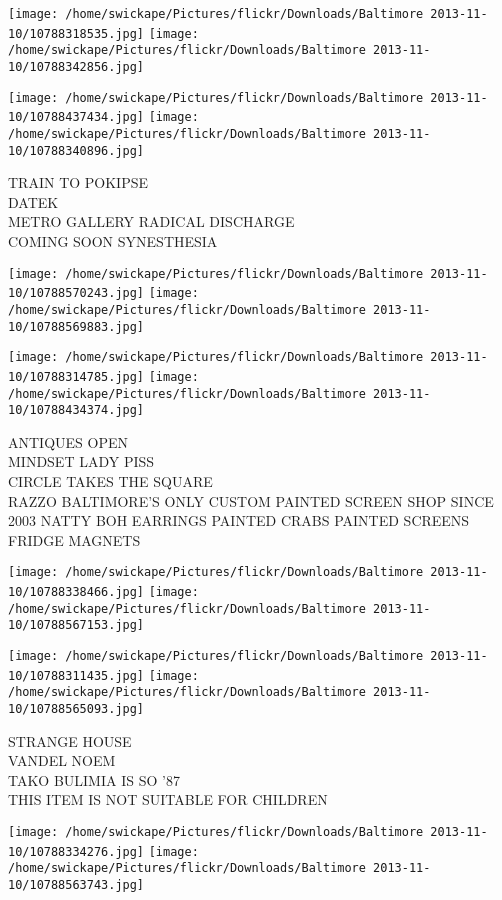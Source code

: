 \documentclass[10pt,letterpaper]{article}
\begin{document}
\texttt{[image: /home/swickape/Pictures/flickr/Downloads/Baltimore 2013-11-10/10788318535.jpg]}
\texttt{[image: /home/swickape/Pictures/flickr/Downloads/Baltimore 2013-11-10/10788342856.jpg]}

\texttt{[image: /home/swickape/Pictures/flickr/Downloads/Baltimore 2013-11-10/10788437434.jpg]}
\texttt{[image: /home/swickape/Pictures/flickr/Downloads/Baltimore 2013-11-10/10788340896.jpg]}

TRAIN TO POKIPSE\\
DATEK\\
METRO GALLERY RADICAL DISCHARGE\\
COMING SOON SYNESTHESIA
\pagebreak

\texttt{[image: /home/swickape/Pictures/flickr/Downloads/Baltimore 2013-11-10/10788570243.jpg]}
\texttt{[image: /home/swickape/Pictures/flickr/Downloads/Baltimore 2013-11-10/10788569883.jpg]}

\texttt{[image: /home/swickape/Pictures/flickr/Downloads/Baltimore 2013-11-10/10788314785.jpg]}
\texttt{[image: /home/swickape/Pictures/flickr/Downloads/Baltimore 2013-11-10/10788434374.jpg]}

ANTIQUES OPEN\\
MINDSET LADY PISS\\
CIRCLE TAKES THE SQUARE\\
RAZZO BALTIMORE'S ONLY CUSTOM PAINTED SCREEN SHOP SINCE 2003 NATTY BOH EARRINGS PAINTED CRABS PAINTED SCREENS FRIDGE MAGNETS
\pagebreak

\texttt{[image: /home/swickape/Pictures/flickr/Downloads/Baltimore 2013-11-10/10788338466.jpg]}
\texttt{[image: /home/swickape/Pictures/flickr/Downloads/Baltimore 2013-11-10/10788567153.jpg]}

\texttt{[image: /home/swickape/Pictures/flickr/Downloads/Baltimore 2013-11-10/10788311435.jpg]}
\texttt{[image: /home/swickape/Pictures/flickr/Downloads/Baltimore 2013-11-10/10788565093.jpg]}

STRANGE HOUSE\\
VANDEL NOEM\\
TAKO BULIMIA IS SO '87\\
THIS ITEM IS NOT SUITABLE FOR CHILDREN
\pagebreak

\texttt{[image: /home/swickape/Pictures/flickr/Downloads/Baltimore 2013-11-10/10788334276.jpg]}
\texttt{[image: /home/swickape/Pictures/flickr/Downloads/Baltimore 2013-11-10/10788563743.jpg]}
\end{document}
